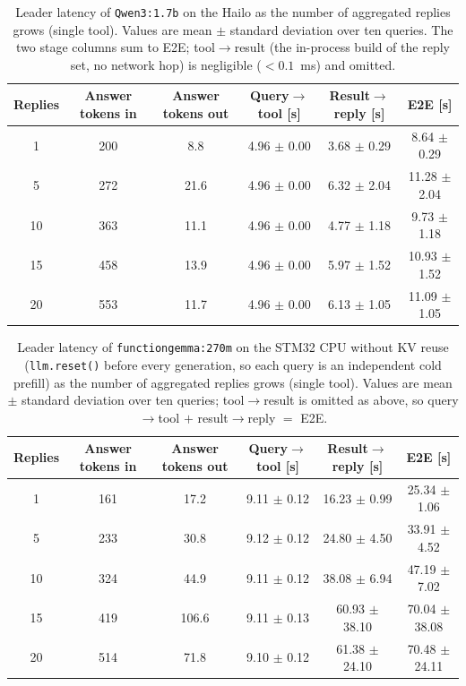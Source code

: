 \begin{table}[H]
\centering
\caption{Leader latency of \texttt{Qwen3:1.7b} on the Hailo as the number of
aggregated replies grows (single tool). Values are mean $\pm$ standard deviation
over ten queries. The two stage columns sum to E2E; tool$\rightarrow$result (the
in-process build of the reply set, no network hop) is negligible ($<0.1$~ms) and
omitted.}
\label{tab:lat_replies}
\small
\begin{tabular}{cccccc}
\toprule
\textbf{Replies} & \textbf{Answer tokens in} & \textbf{Answer tokens out} & \textbf{Query$\rightarrow$tool [s]} & \textbf{Result$\rightarrow$reply [s]} & \textbf{E2E [s]} \\
\midrule
1 & 200 & 8.8 & 4.96 $\pm$ 0.00 & 3.68 $\pm$ 0.29 & 8.64 $\pm$ 0.29 \\
5 & 272 & 21.6 & 4.96 $\pm$ 0.00 & 6.32 $\pm$ 2.04 & 11.28 $\pm$ 2.04 \\
10 & 363 & 11.1 & 4.96 $\pm$ 0.00 & 4.77 $\pm$ 1.18 & 9.73 $\pm$ 1.18 \\
15 & 458 & 13.9 & 4.96 $\pm$ 0.00 & 5.97 $\pm$ 1.52 & 10.93 $\pm$ 1.52 \\
20 & 553 & 11.7 & 4.96 $\pm$ 0.00 & 6.13 $\pm$ 1.05 & 11.09 $\pm$ 1.05 \\
\bottomrule
\end{tabular}
\end{table}

\begin{table}[H]
\centering
\caption{Leader latency of \texttt{functiongemma:270m} on the STM32 CPU without KV
reuse (\texttt{llm.reset()} before every generation, so each query is an independent
cold prefill) as the number of aggregated replies grows (single tool). Values are
mean $\pm$ standard deviation over ten queries; tool$\rightarrow$result is omitted as
above, so query$\rightarrow$tool $+$ result$\rightarrow$reply $=$ E2E.}
\label{tab:lat_replies_reset}
\small
\begin{tabular}{cccccc}
\toprule
\textbf{Replies} & \textbf{Answer tokens in} & \textbf{Answer tokens out} & \textbf{Query$\rightarrow$tool [s]} & \textbf{Result$\rightarrow$reply [s]} & \textbf{E2E [s]} \\
\midrule
1 & 161 & 17.2 & 9.11 $\pm$ 0.12 & 16.23 $\pm$ 0.99 & 25.34 $\pm$ 1.06 \\
5 & 233 & 30.8 & 9.12 $\pm$ 0.12 & 24.80 $\pm$ 4.50 & 33.91 $\pm$ 4.52 \\
10 & 324 & 44.9 & 9.11 $\pm$ 0.12 & 38.08 $\pm$ 6.94 & 47.19 $\pm$ 7.02 \\
15 & 419 & 106.6 & 9.11 $\pm$ 0.13 & 60.93 $\pm$ 38.10 & 70.04 $\pm$ 38.08 \\
20 & 514 & 71.8 & 9.10 $\pm$ 0.12 & 61.38 $\pm$ 24.10 & 70.48 $\pm$ 24.11 \\
\bottomrule
\end{tabular}
\end{table}

